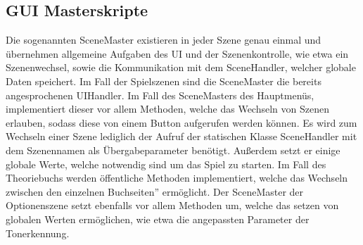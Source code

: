 \subsection*{GUI Masterskripte}
Die sogenannten SceneMaster existieren in jeder Szene genau einmal und übernehmen allgemeine Aufgaben des UI und der Szenenkontrolle, wie etwa ein Szenenwechsel, sowie die Kommunikation mit dem SceneHandler, welcher globale Daten speichert. Im Fall der Spielszenen sind die SceneMaster die bereits angesprochenen UIHandler. Im Fall des SceneMasters des Hauptmenüs, implementiert dieser vor allem Methoden, welche das Wechseln von Szenen erlauben, sodass diese von einem Button aufgerufen werden können. Es wird zum Wechseln einer Szene lediglich der Aufruf der statischen Klasse SceneHandler mit dem Szenennamen als Übergabeparameter benötigt. Außerdem setzt er einige globale Werte, welche notwendig sind um das Spiel zu starten. Im Fall des Theoriebuchs werden öffentliche Methoden implementiert, welche das Wechseln zwischen den einzelnen \glqq Buchseiten'' ermöglicht. Der SceneMaster der Optionenszene setzt ebenfalls vor allem Methoden um, welche das setzen von globalen Werten ermöglichen, wie etwa die angepassten Parameter der Tonerkennung.  

